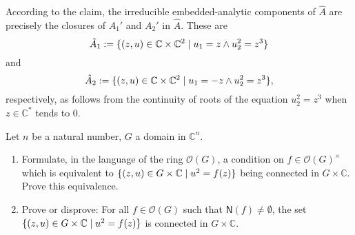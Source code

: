 \documentclass[a4paper]{amsart}
\newcommand{\C}{\mathbb{C}}
\newcommand{\Zero}[1]{\mathsf{N}(#1)}
\renewcommand{\O}{\mathcal{O}}
\theoremstyle{remark}
\numberwithin{equation}{question}
\DeclarePairedDelimiter\set{\{}{\}}
\begin{document}
\begin{solution}
\begin{solenum}
According to the claim, the irreducible embedded-analytic components of $\hat A$ are precisely the closures of $A_1'$ and $A_2'$ in $\hat A$. These are
\[
\hat A_1 := \set{(z,u) \in \C \times \C^2 \mid u_1 = z \land u_2^2 = z^3}
\]
and
\[
\hat A_2 := \set{(z,u) \in \C \times \C^2 \mid u_1 = -z \land u_2^2 = z^3},
\]
respectively, as follows from the continuity of roots of the equation $u_2^2 = z^3$ when $z \in \C^*$ tends to $0$.
\end{solenum}
\end{solution}

\begin{question}[name=Exercise*]
\label{qu:quadratic coverings}
Let $n$ be a natural number, $G$ a domain in $\C^n$. 
\begin{enumerate}
\item\label{it:quadratic coverings-a} Formulate, in the language of the ring $\O(G)$, a condition on $f \in \O(G)^\times$ which is equivalent to $\set{(z,u) \in G \times \C \mid u^2 = f(z)}$ being connected in $G \times \C$. Prove this equivalence.
\item Prove or disprove: For all $f \in \O(G)$ such that $\Zero f \ne \emptyset$, the set $\set{(z,u) \in G \times \C \mid u^2 = f(z)}$ is connected in $G \times \C$.
\end{enumerate}
\end{question}
\end{document}
